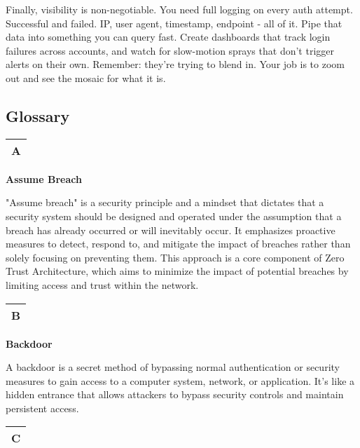 Finally, visibility is non-negotiable. You need full logging on every auth attempt. Successful and failed. IP, user agent, timestamp, endpoint - all of it. Pipe that data into something you can query fast. Create dashboards that track login failures across accounts, and watch for slow-motion sprays that don’t trigger alerts on their own. Remember: they’re trying to blend in. Your job is to zoom out and see the mosaic for what it is.

\subsection{\textbf{Glossary}}

\begin{table}
\justifying

\begin{tabular}{l}
\textbf{A} \\
\hline

\end{tabular}

\end{table}

\textbf{Assume Breach}

"Assume breach" is a security principle and a mindset that dictates that a security system should be designed and operated under the assumption that a breach has already occurred or will inevitably occur. It emphasizes proactive measures to detect, respond to, and mitigate the impact of breaches rather than solely focusing on preventing them. This approach is a core component of Zero Trust Architecture, which aims to minimize the impact of potential breaches by limiting access and trust within the network.

\begin{table}
\justifying

\begin{tabular}{l}
\textbf{B} \\
\hline

\end{tabular}

\end{table}

\textbf{Backdoor}

A backdoor is a secret method of bypassing normal authentication or security measures to gain access to a computer system, network, or application. It's like a hidden entrance that allows attackers to bypass security controls and maintain persistent access.

\begin{table}
\justifying

\begin{tabular}{l}
\textbf{C} \\
\hline

\end{tabular}

\end{table}

